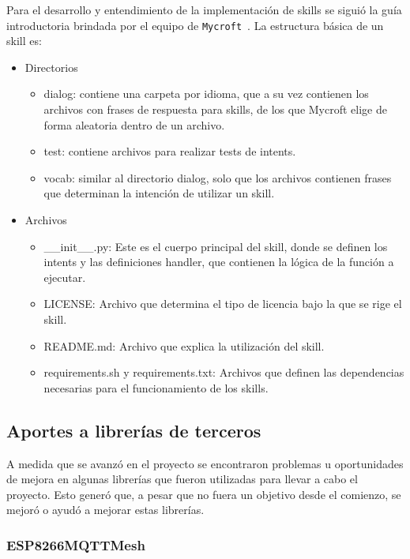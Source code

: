 Para el desarrollo y entendimiento de la implementación de skills se siguió la guía introductoria brindada por el equipo de \lstinline[columns=fixed]{Mycroft}~\cite{GuiaMycroft}.
La estructura básica de un skill es:
\begin{itemize}
  \item Directorios

  \begin{itemize}
    \item dialog: contiene una carpeta por idioma, que a su vez contienen los archivos con frases de respuesta para skills, de los que Mycroft elige de forma aleatoria dentro de un archivo.
    \item test: contiene archivos para realizar tests de intents.
    \item vocab: similar al directorio dialog, solo que los archivos contienen frases que determinan la intención de utilizar un skill.
  \end{itemize}

  \item Archivos
  \begin{itemize}
    \item \_\_init\_\_.py: Este es el cuerpo principal del skill, donde se definen los intents y las definiciones handler, que contienen la lógica de la función a ejecutar.
    \item LICENSE: Archivo que determina el tipo de licencia bajo la que se rige el skill.
    \item README.md: Archivo que explica la utilización del skill.
    \item requirements.sh y requirements.txt: Archivos que definen las dependencias necesarias para el funcionamiento de los skills.

  \end{itemize}
\end{itemize}

\subsection{Aportes a librerías de terceros}

A medida que se avanzó en el proyecto se encontraron problemas u oportunidades de mejora en algunas librerías que fueron utilizadas para llevar a cabo el proyecto. Esto generó que, a pesar que no fuera un objetivo desde el comienzo, se mejoró o ayudó a mejorar estas librerías.

\subsubsection{ESP8266MQTTMesh}

